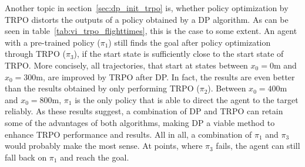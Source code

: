 Another topic in section~\ref{sec:dp_init_trpo} is, whether policy optimization by TRPO distorts the outputs of a policy obtained by a DP algorithm. As can be seen in table~\ref{tab:vi_trpo_flighttimes}, this is the case to some extent. An agent with a pre-trained policy ($\pi_1$) still finds the goal after policy optimization through TRPO ($\pi_3$), if the start state is sufficiently close to the start state of TRPO. More concisely, all trajectories, that start at states between $x_0 = 0\text{m}$ and $x_0 = 300\text{m}$, are improved by TRPO after DP. In fact, the results are even better than the results obtained by only performing TRPO ($\pi_2$). Between $x_0 = 400\text{m}$ and $x_0 = 800\text{m}$, $\pi_1$ is the only policy that is able to direct the agent to the target reliably. 
As these results suggest, a combination of DP and TRPO can retain some of the advantages of both algorithms, making DP a viable method to enhance TRPO performance and results. All in all, a combination of $\pi_1$ and $\pi_3$ would probably make the most sense. At points, where $\pi_3$ fails, the agent can still fall back on $\pi_1$ and reach the goal.
